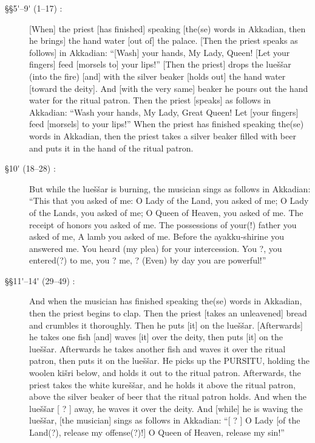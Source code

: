 \documentclass[10pt]{article}
\newcommand{\pr}{\'{ }}									%
\renewcommand{\.}[1]{\textsubdot{#1}}
\begin{document}
\begin{description}
\item[\S\S5{\pr}--9{\pr} (1--17) :] {[}When] the priest [has finished] speaking [the(se) words in Akkadian, then he brings] the hand water [out of] the palace. [Then the priest speaks as follows] in Akkadian: ``[Wash] your hands, My Lady, Queen! [Let your fingers] feed [morsels to] your lips!'' [Then the priest] drops the lue\v{s}\v{s}ar (into the fire) [and] with the silver beaker [holds out] the hand water [toward the deity]. And [with the very same] beaker he pours out the hand water for the ritual patron. Then the priest [speaks] as follows in Akkadian: ``Wash your hands, My Lady, Great Queen! Let [your fingers] feed [morsels] to your lips!'' When the priest has finished speaking the(se) words in Akkadian, then the priest takes a silver beaker filled with beer and puts it in the hand of the ritual patron.

\begin{notes}



\end{notes}

\item[\S10{\pr} (18--28) :] But while the lue\v{s}\v{s}ar is burning, the musician sings as follows in Akkadian: ``This that you asked of me: O Lady of the Land, you asked of me; O Lady of the Lands, you asked of me; O Queen of Heaven, you asked of me. The receipt of honors you asked of me. The possessions of your(!) father you asked of me, A lamb you asked of me. Before the ayakku-shirine you answered me. You heard (my plea) for your intercession. You ?, you entered(?) to me, you ? me, ? (Even) by day you are powerful!''

\begin{notes}



\end{notes}

\item[\S\S11{\pr}--14{\pr} (29--49) :] And when the musician has finished speaking the(se) words in Akkadian, then the priest begins to clap. Then the priest [takes an unleavened] bread and crumbles it thoroughly. Then he puts [it] on the lue\v{s}\v{s}ar. [Afterwards] he takes one fish [and] waves [it] over the deity, then puts [it] on the lue\v{s}\v{s}ar. Afterwards he takes another fish and waves it over the ritual patron, then puts it on the lue\v{s}\v{s}ar. He picks up the PURSITU, holding the woolen ki\v{s}ri below, and holds it out to the ritual patron. Afterwards, the priest takes the white kure\v{s}\v{s}ar, and he holds it above the ritual patron, above the silver beaker of beer that the ritual patron holds. And when the lue\v{s}\v{s}ar [ ? ] away, he waves it over the deity. And [while] he is waving the lue\v{s}\v{s}ar, [the musician] sings as follows in Akkadian: ``[ ? ] O Lady [of the Land(?), release my offense(?)!] O Queen of Heaven, release my sin!''


\end{description}
\end{document}
